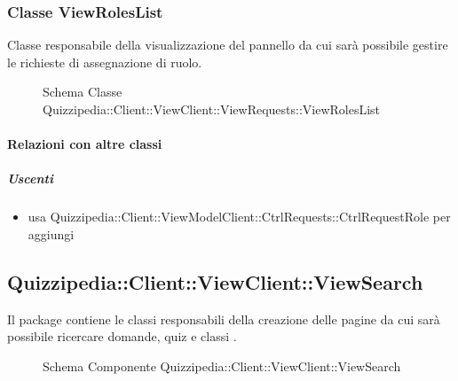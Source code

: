 \subsubsection{Classe ViewRolesList}
Classe responsabile della visualizzazione del pannello da cui sarà possibile gestire le richieste di assegnazione di ruolo.
\begin{figure}[H]
\centering
\noindent{}
\caption[Schema Classe ViewRolesList]{Schema Classe Quizzipedia::Client::ViewClient::ViewRequests::ViewRolesList}
\end{figure}
\paragraph{Relazioni con altre classi}
\subparagraph{Uscenti}
\begin{itemize}
\item usa Quizzipedia::Client::ViewModelClient::CtrlRequests::CtrlRequestRole per aggiungi
\end{itemize}
\subsection{Quizzipedia::Client::ViewClient::ViewSearch}
Il package contiene le classi responsabili della creazione delle pagine da cui sarà possibile ricercare domande, quiz e classi .
\begin{figure}[H]
\centering
\noindent{}
\caption[Schema Componente Quizzipedia::Client::ViewClient::ViewSearch]{Schema Componente Quizzipedia::Client::ViewClient::ViewSearch}
\end{figure}

